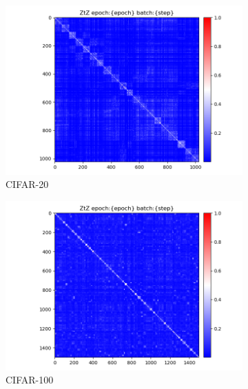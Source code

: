 \documentclass[10pt,twocolumn,letterpaper]{article}
\begin{document}
   \begin{figure}
    \centering
    \begin{subfigure}{0.33\textwidth}
      \includegraphics[width=\linewidth,trim={1cm 0 1cm 0.8cm},clip]{figures/experiments/larger_dataset/CIFAR100_20_Heatmap.png}
      \caption{CIFAR-20}
      \label{fig:CIFAR-20-heat}
    \end{subfigure}
    \hfill
    \begin{subfigure}{0.33\textwidth}
      \includegraphics[width=\linewidth,trim={1cm 0 1cm 0.8cm},clip]{figures/experiments/larger_dataset/CIFAR100_100_Heatmap.png}
      \caption{CIFAR-100}
      \label{fig:CIFAR-100-heap}
    \end{subfigure}
    \hfill
    \begin{subfigure}{0.33\textwidth}

\end{subfigure}
\end{figure}
\end{document}

